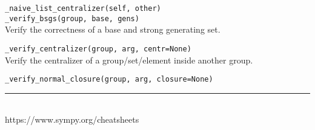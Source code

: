 \documentclass[10pt,landscape]{article}
\begin{document}
\begin{multicols}{3}
\verb!_naive_list_centralizer(self, other)!\\


\verb!_verify_bsgs(group, base, gens)!\\
Verify the correctness of a base and strong generating set.

\verb!_verify_centralizer(group, arg, centr=None)!\\
Verify the centralizer of a group/set/element inside another group.

\verb!_verify_normal_closure(group, arg, closure=None)!\\



\rule{0.3\linewidth}{0.25pt}
\scriptsize\\
https://www.sympy.org/cheatsheets


\end{multicols}
\end{document}
